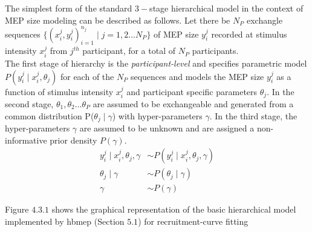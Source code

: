 \documentclass[a4paper,12pt]{article}
\begin{document}
The simplest form of the standard $3-$stage hierarchical model in the context of MEP size modeling can be described as follows. Let there be $N_P$ exchangle sequences $\{(x_i^j, y_i^j)_{i=1}^{n_j} \mid j = 1, 2 \ldots N_P\}$ of MEP size $y_i^j$ recorded at stimulus intensity $x_i^j$ from $j^{th}$ participant, for  a total of $N_P$ participants.\\

The first stage of hierarchy is the \textit{participant-level} and specifies parametric model $P(y_i^j \mid x_i^j, \theta_j)$ for each of the $N_P$ sequences and models the MEP size $y_i^j$ as a function of stimulus intensity $x_i^j$ and participant specific parameters $\theta_j$. In the second stage, $\theta_1, \theta_2 \ldots \theta_P$ are  assumed to be exchangeable and generated from  a common distribution P($\theta_j \mid \gamma$) with hyper-parameters $\gamma$. In the third stage, the hyper-parameters $\gamma$ are assumed to be unknown and are assigned a non-informative prior density $P(\gamma)$.\\

\begin{align*}
y_i^j \mid x_i^j, \theta_j, \gamma &\sim P(y_i^j \mid x_i^j, \theta_j, \gamma) \tag{4.3.1} \\
\theta_j \mid \gamma &\sim P(\theta_j \mid \gamma) \tag{4.3.2} \\
\gamma &\sim P(\gamma) \tag{4.3.3}
\end{align*}

Figure $4.3.1$ shows the graphical representation of the basic hierarchical model implemented by hbmep (Section $5.1$) for recruitment-curve fitting\\
\end{document}
